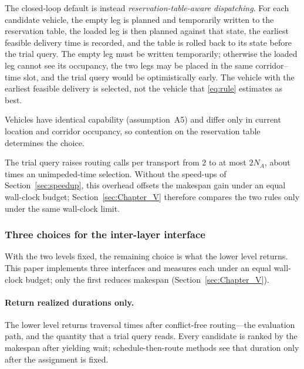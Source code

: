The closed-loop default is instead \emph{reservation-table-aware dispatching}.
For each candidate vehicle, the empty leg is planned and temporarily written to the reservation table, the loaded leg is then planned against that state, the earliest feasible delivery time is recorded, and the table is rolled back to its state before the trial query.
The empty leg must be written temporarily; otherwise the loaded leg cannot see its occupancy, the two legs may be placed in the same corridor--time slot, and the trial query would be optimistically early.
The vehicle with the earliest feasible delivery is selected, not the vehicle that \eqref{eq:rule} estimates as best.

Vehicles have identical capability (assumption~A5) and differ only in current location and corridor occupancy, so contention on the reservation table determines the choice.

The trial query raises routing calls per transport from $2$ to at most $2N_A$, about \CostMultBefore{} times an unimpeded-time selection.
Without the speed-ups of Section~\ref{sec:speedup}, this overhead offsets the makespan gain under an equal wall-clock budget; Section~\ref{sec:Chapter_V} therefore compares the two rules only under the same wall-clock limit.

\subsubsection{Three choices for the inter-layer interface}
\label{sec:interface}

With the two levels fixed, the remaining choice is what the lower level returns.
This paper implements three interfaces and measures each under an equal wall-clock budget; only the first reduces makespan (Section~\ref{sec:Chapter_V}).

\paragraph{Return realized durations only.}
The lower level returns traversal times after conflict-free routing---the evaluation path, and the quantity that a trial query reads.
Every candidate is ranked by the makespan after yielding wait; schedule-then-route methods see that duration only after the assignment is fixed.

